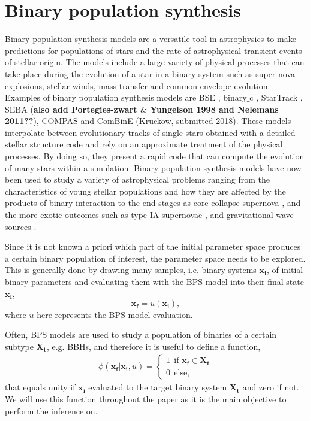 \documentclass[a4paper,fleqn,usenatbib]{mnras}
\begin{document}
\section{Binary population synthesis}
\label{sec:BPS}
Binary population synthesis models are a versatile tool in astrophysics to make predictions for populations of stars and the rate of astrophysical transient events of stellar origin. 
The models include a large variety of physical processes that can take place during the evolution of a star in a binary system such as super nova explosions, stellar winds, mass transfer and common envelope evolution. Examples of binary population synthesis models are  BSE \citep{hurley2000comprehensive,hurley2002evolution}, binary$\_$c \citep{izzard2004new, izzard2009population}, StarTrack \citep{belczynski2008compact}, SEBA \citep{portegies1996population,verbunt1996high} (\textbf{also add Portegies-zwart $\&$ Yungelson 1998 and Nelemans 2011??}), COMPAS \citep{stevenson2017formation} and ComBinE (Kruckow, submitted 2018). These models interpolate between evolutionary tracks of single stars obtained with a detailed stellar structure code \citep{pols1998stellar} and rely on an approximate treatment of the physical processes.  By doing so, they present a rapid code that can compute the evolution of many stars within a simulation. 
Binary population synthesis models have now been used to study a variety of astrophysical problems ranging from the characteristics of young stellar populations and how they are affected by the products of binary interaction \citep{de2013rotation,schneider2014bonnsai}  to the end stages as core collapse supernova \citep{zapartas2017delay}, and the more exotic outcomes such as type IA supernovae \citep{toonen2012supernova}, and gravitational wave sources \citep{belczynski2017gw170104}.

Since it is not known a priori which part of the initial parameter space produces a certain binary population of interest, the parameter space needs to be explored. This is generally done  by drawing many samples, i.e. binary systems $\mathbf{x_i}$, of initial binary parameters and evaluating them with the BPS model into their final state $\mathbf{x_f}$,  
%
\begin{equation}
	\mathbf{x_f} = u(\mathbf{x_i}),
	\label{eq:BPS-u(x)}
\end{equation}
%
where $u$ here represents the BPS model evaluation.

Often, BPS models are used to study a population of binaries of a certain subtype $\mathbf{X_t}$, e.g. BBHs, and therefore it is  useful to define a function, 
%
 \begin{align*}
 \phi(\mathbf{x_f} | \mathbf{x_i}, u) = \begin{cases}    1 \ \ \text{if } \mathbf{ x_f} \in   \mathbf{X_t}    \\ 0 \ \   \text{else,}   \end{cases}
 \end{align*} 
% 
that equals unity if $\mathbf{x_i}$ evaluated to the target binary system $\mathbf{X_t}$ and zero if not.  
We will use this function throughout the paper as it is the main objective to perform the inference on. 
\end{document}
